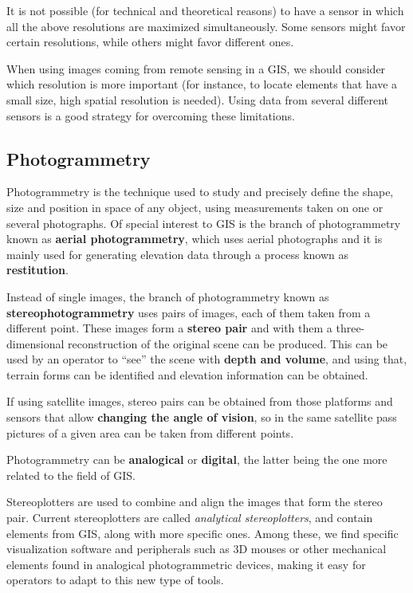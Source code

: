It is not possible (for technical and theoretical reasons) to have a sensor in which all the above resolutions are maximized simultaneously. Some sensors might favor certain resolutions, while others might favor different ones.

When using images coming from remote sensing in a GIS, we should consider which resolution is more important (for instance, to locate elements that have a small size, high spatial resolution is needed). Using data from several different sensors is a good strategy for overcoming these limitations.


\subsection{Photogrammetry}

Photogrammetry is the technique used to study and precisely define the shape, size and position in space of any object, using measurements taken on one or several photographs. Of special interest to GIS is the branch of photogrammetry known as \textbf{aerial photogrammetry}, which uses aerial photographs and it is mainly used for generating elevation data through a process known as \textbf{restitution}.

Instead of single images, the branch of photogrammetry known as \textbf{stereophotogrammetry} uses pairs of images, each of them taken from a different point. These images form a \textbf{stereo pair} and with them a three-dimensional reconstruction of the original scene can be produced. This can be used by an operator to ``see'' the scene with \textbf{depth and volume}, and using that, terrain forms can be identified and elevation information can be obtained. 

If using satellite images, stereo pairs can be obtained from those platforms and sensors that allow \textbf{changing the angle of vision}, so in the same satellite pass pictures of a given area can be taken from different points.

Photogrammetry can be \textbf{analogical} or \textbf{digital}, the latter being the one more related to the field of GIS.

Stereoplotters are used to combine and align the images that form the stereo pair. Current stereoplotters are called \emph{analytical stereoplotters}, and contain elements from GIS, along with more specific ones. Among these, we find specific visualization software and peripherals such as 3D mouses or other mechanical elements found in analogical photogrammetric devices, making it easy for operators to adapt to this new type of tools.

